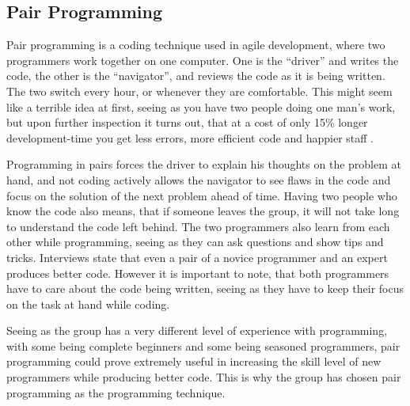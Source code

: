 \subsection{Pair Programming}
Pair programming is a coding technique used in agile development, where two programmers work together on one computer. 
One is the ``driver'' and writes the code, the other is the ``navigator'', and reviews the code as it is being written. 
The two switch every hour, or whenever they are comfortable. 
This might seem like a terrible idea at first, seeing as you have two people doing one man's work, 
but upon further inspection it turns out, that at a cost of only 15\% longer development-time 
you get less errors, more efficient code and happier staff \cite{cockburn00}. 

Programming in pairs forces the driver to explain his thoughts on the problem at hand, 
and not coding actively allows the navigator to see flaws in the code 
and focus on the solution of the next problem ahead of time. Having two people who know the code also
means, that if someone leaves the group, it will not take long to understand the code left behind.
The two programmers also learn from each other while programming, seeing as they can ask questions and show tips and tricks. Interviews state that even a pair of a novice programmer and an expert produces better code.\cite{cockburn00} However it is important to note, that both programmers have to care about the code being written, seeing as they have to keep their focus on the task at hand while coding.

Seeing as the group has a very different level of experience with programming, with some being complete beginners and some being seasoned programmers, pair programming could prove extremely useful in increasing the skill level of new programmers while producing better code. This is why the group has chosen pair programming as the programming technique.